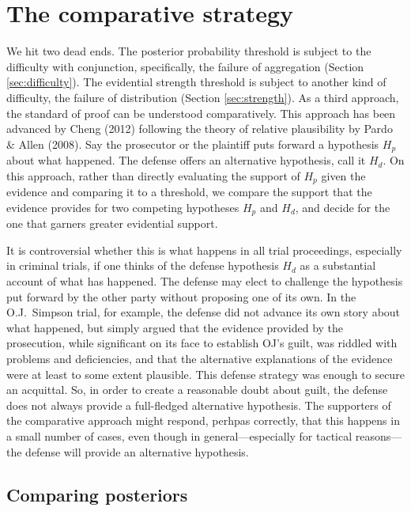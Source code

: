 \documentclass[
  10pt,
  dvipsnames,enabledeprecatedfontcommands]{scrartcl}
\begin{document}
\hypertarget{the-comparative-strategy}{%
\section{The comparative strategy}\label{the-comparative-strategy}}

\label{sec:comparative}

We hit two dead ends. The posterior probability threshold is subject to
the difficulty with conjunction, specifically, the failure of
aggregation (Section \ref{sec:difficulty}). The evidential strength
threshold is subject to another kind of difficulty, the failure of
distribution (Section \ref{sec:strength}). As a third approach, the
standard of proof can be understood comparatively. This approach has
been advanced by Cheng (2012) following the theory of relative
plausibility by Pardo \& Allen (2008). Say the prosecutor or the
plaintiff puts forward a hypothesis \(H_p\) about what happened. The
defense offers an alternative hypothesis, call it \(H_d\). On this
approach, rather than directly evaluating the support of \(H_p\) given
the evidence and comparing it to a threshold, we compare the support
that the evidence provides for two competing hypotheses \(H_p\) and
\(H_d\), and decide for the one that garners greater evidential support.

It is controversial whether this is what happens in all trial
proceedings, especially in criminal trials, if one thinks of the defense
hypothesis \(H_d\) as a substantial account of what has happened. The
defense may elect to challenge the hypothesis put forward by the other
party without proposing one of its own. In the O.J.~Simpson trial, for
example, the defense did not advance its own story about what happened,
but simply argued that the evidence provided by the prosecution, while
significant on its face to establish OJ's guilt, was riddled with
problems and deficiencies, and that the alternative explanations of the
evidence were at least to some extent plausible. This defense strategy
was enough to secure an acquittal. So, in order to create a reasonable
doubt about guilt, the defense does not always provide a full-fledged
alternative hypothesis. The supporters of the comparative approach might
respond, perhpas correctly, that this happens in a small number of
cases, even though in general---especially for tactical reasons---the
defense will provide an alternative hypothesis.

\hypertarget{comparing-posteriors}{%
\subsection{Comparing posteriors}\label{comparing-posteriors}}
\end{document}
